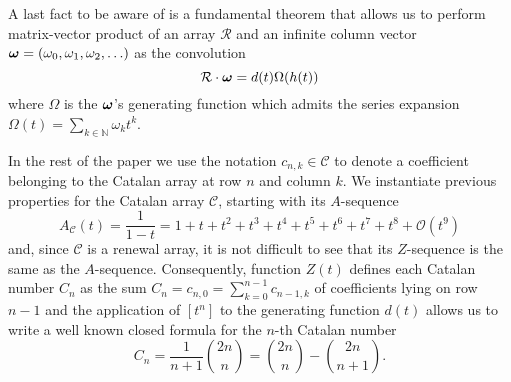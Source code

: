 A last fact to be aware of is a fundamental theorem that allows us to perform
matrix-vector product of an array $\mathcal{R}$ and an infinite column vector
$\boldsymbol{\omega}=(\omega_{0},\omega_{1},\omega_{2},\ldots)$
as the convolution
\begin{equation}
    \mathcal{R}\cdot\boldsymbol{\omega} = d(t)\Omega(h(t))
\end{equation}
where $\Omega$ is the $\boldsymbol{\omega}$'s generating function which admits the
series expansion $\Omega(t)=\sum_{k\in\mathbb{N}}{\omega_{k}t^{k}}$.

In the rest of the paper we use the notation $c_{n,k}\in\mathcal{C}$ to denote
a coefficient belonging to the Catalan array at row $n$ and column $k$.
We instantiate previous properties for the Catalan array $\mathcal{C}$,
starting with its $A$-sequence
\begin{displaymath}
    A_{\mathcal{C}}(t)=\frac{1}{1-t}=1+t+t^{2}+t^{3}+t^{4}+t^{5}+t^{6}+t^{7}+t^{8}+
        \mathcal{O}(t^{9})
\end{displaymath}
and, since $\mathcal{C}$ is a renewal array, it is not difficult to see that
its $Z$-sequence is the same as the $A$-sequence. Consequently, function $Z(t)$
defines each Catalan number $C_{n}$ as the sum $\displaystyle C_{n} = c_{n,0} =
\sum_{k=0}^{n-1}{c_{n-1,k}} $ of coefficients lying on row $n-1$ and
the application of $[t^{n}]$ to the generating function $d(t)$ 
allows us to write a well known closed formula for the $n$-th Catalan number
\begin{equation}
    C_{n} = \frac{1}{n+1}{{2n}\choose{n}} = {{2n}\choose{n}} - {{2n}\choose{n+1}}.
    \label{eq:catalan:coeff:rewriting}
\end{equation}

